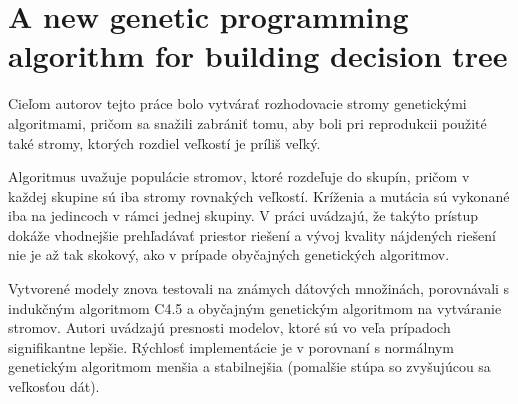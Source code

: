 \section{A new genetic programming algorithm for building decision tree}\label{kap6:6.2:Hybrid}
Cieľom autorov \cite{kap6-group} tejto práce bolo vytvárať rozhodovacie stromy genetickými algoritmami, pričom sa snažili zabrániť tomu, aby boli pri reprodukcii použité také stromy, ktorých rozdiel veľkostí je príliš veľký. 

Algoritmus uvažuje populácie stromov, ktoré rozdeľuje do skupín, pričom v každej skupine sú iba stromy rovnakých veľkostí. Kríženia a mutácia sú vykonané iba na jedincoch v rámci jednej skupiny. V práci uvádzajú, že takýto prístup dokáže vhodnejšie prehľadávať priestor riešení a vývoj kvality nájdených riešení nie je až tak skokový, ako v prípade obyčajných genetických algoritmov.

Vytvorené modely znova testovali na známych dátových množinách, porovnávali s indukčným algoritmom C4.5 a obyčajným genetickým algoritmom na vytváranie stromov. Autori uvádzajú presnosti modelov, ktoré sú vo veľa prípadoch signifikantne lepšie. Rýchlosť implementácie je v porovnaní s normálnym genetickým algoritmom menšia a stabilnejšia (pomalšie stúpa so zvyšujúcou sa veľkosťou dát).

